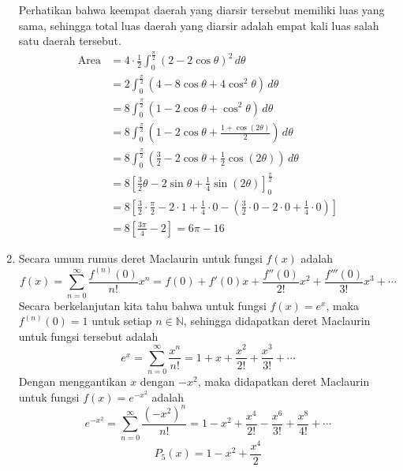 \documentclass[11pt,openany,a4paper]{article}
\begin{document}
\begin{enumerate}
\begin{center}
        \end{center}
        Perhatikan bahwa keempat daerah yang diarsir tersebut memiliki luas yang sama, sehingga total luas daerah yang diarsir adalah empat kali luas salah satu daerah tersebut.
        \begin{align*}
            \text{Area} &= 4 \cdot \frac{1}{2} \int_{0}^{\frac{\pi}{2}} (2 - 2\cos\theta)^2 \, d\theta \\
            &= 2 \int_{0}^{\frac{\pi}{2}} \left( 4 - 8\cos\theta + 4\cos^2\theta \right) \, d\theta \\
            &= 8 \int_{0}^{\frac{\pi}{2}} \left( 1 - 2\cos\theta + \cos^2\theta \right) \, d\theta \\
            &= 8 \int_{0}^{\frac{\pi}{2}} \left( 1 - 2\cos\theta + \frac{1 + \cos(2\theta)}{2} \right) \, d\theta \\
            &= 8 \int_{0}^{\frac{\pi}{2}} \left( \frac{3}{2} - 2\cos\theta + \frac{1}{2}\cos(2\theta) \right) \, d\theta \\
            &= 8 \left[ \frac{3}{2}\theta - 2\sin\theta + \frac{1}{4}\sin(2\theta) \right]_{0}^{\frac{\pi}{2}} \\
            &= 8 \left[ \frac{3}{2}\cdot\frac{\pi}{2} - 2\cdot1 + \frac{1}{4}\cdot0 - \left( \frac{3}{2}\cdot0 - 2\cdot0 + \frac{1}{4}\cdot0 \right) \right] \\
            &= 8 \left[ \frac{3\pi}{4} - 2 \right] = \boxed{6\pi - 16 }
        \end{align*}
      \item Secara umum rumus deret Maclaurin untuk fungsi \( f(x) \) adalah
        \[
            f(x) = \sum_{n=0}^{\infty} \frac{f^{(n)}(0)}{n!} x^n = f(0) + f'(0)x + \frac{f''(0)}{2!}x^2 + \frac{f'''(0)}{3!}x^3 + \cdots
        \]
        Secara berkelanjutan kita tahu bahwa untuk fungsi \( f(x) = e^x\), maka $f^{(n)}(0) = 1$ untuk setiap $n\in\mathbb{N}$, sehingga didapatkan deret Maclaurin untuk fungsi tersebut adalah
        \[
            e^x = \sum_{n=0}^{\infty} \frac{x^n}{n!} = 1 + x + \frac{x^2}{2!} + \frac{x^3}{3!} + \cdots
        \]
        Dengan menggantikan \( x \) dengan \( -x^2 \), maka didapatkan deret Maclaurin untuk fungsi \( f(x) = e^{-x^2} \) adalah
        \[
            e^{-x^2} = \sum_{n=0}^{\infty} \frac{(-x^2)^n}{n!} = 1 - x^2 + \frac{x^4}{2!} - \frac{x^6}{3!} + \frac{x^8}{4!} + \cdots
        \]
        \[
            \boxed{P_5(x) = 1 - x^2 + \frac{x^4}{2}}
        \]
    \end{enumerate}
\end{document}

